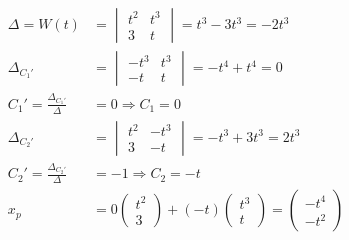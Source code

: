 \documentclass{article}
\begin{document}
\begin{align*}
    \Delta = W(t)                     & =\begin{vmatrix}
                                             t^2 & t^3 \\
                                             3   & t
                                         \end{vmatrix} = t^3 - 3t^3=-2t^3                 \\
    \Delta_{C_1'}                     & =\begin{vmatrix}
                                             -t^3 & t^3 \\
                                             -t   & t
                                         \end{vmatrix} = -t^4+t^4=0                       \\
    C_1'=\frac{\Delta_{C_1'}}{\Delta} & =0 \Rightarrow C_1=0                              \\
    \Delta_{C_2'}                     & =\begin{vmatrix}
                                             t^2 & -t^3 \\
                                             3   & -t
                                         \end{vmatrix} = -t^3+3t^3=2t^3                   \\
    C_2'=\frac{\Delta_{C_2'}}{\Delta} & =-1 \Rightarrow C_2=-t                            \\
    x_p                               & = 0\begin{pmatrix}
                                               t^2 \\
                                               3
                                           \end{pmatrix}+(-t)\begin{pmatrix}
                                                                 t^3 \\
                                                                 t
                                                             \end{pmatrix}=\begin{pmatrix}
                                                                               -t^4 \\
                                                                               -t^2
                                                                           \end{pmatrix}
\end{align*}
\end{document}
